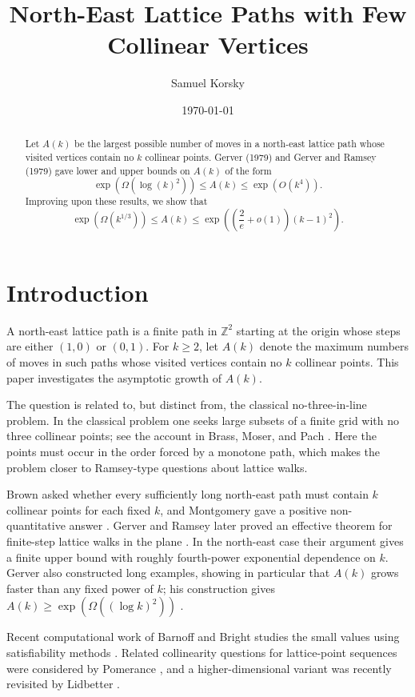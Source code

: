 \documentclass[11pt]{article}
\title{North-East Lattice Paths with Few Collinear Vertices}
\author{Samuel Korsky}
\date{\today}
\theoremstyle{definition}
\theoremstyle{remark}
\newcommand{\Z}{\mathbb Z}
\newcommand{\1}{\mathbf 1}
\begin{document}
\maketitle


\begin{abstract}
\noindent
Let $A(k)$ be the largest possible number of moves in a north-east lattice path whose visited vertices contain no $k$ collinear points.  Gerver (1979) and Gerver and Ramsey (1979) gave lower and upper bounds on $A(k)$ of the form
\[
\exp\left(\Omega(\log(k)^2)\right)\le A(k)\le
\exp\left(O(k^4)\right).
\]
Improving upon these results, we show that
\[
\exp\left(\Omega(k^{1/3})\right)\le A(k)\le
\exp\left(\left(\frac{2}{e}+o(1)\right)(k-1)^2\right).
\]
\end{abstract}

\section{Introduction}

A north-east lattice path is a finite path in $\Z^2$ starting at the origin whose steps are either $(1,0)$ or $(0,1)$. For $k\ge2$, let $A(k)$ denote the maximum numbers of moves in such paths whose visited vertices contain no $k$ collinear points. This paper investigates the asymptotic growth of $A(k)$.

\bigskip
\noindent
The question is related to, but distinct from, the classical no-three-in-line problem. In the classical problem one seeks large subsets of a finite grid with no three collinear points; see the account in Brass, Moser, and Pach \cite{BMP}. Here the points must occur in the order forced by a monotone path, which makes the problem closer to Ramsey-type questions about lattice walks.

\bigskip
\noindent
Brown asked whether every sufficiently long north-east path must contain $k$ collinear points for each fixed $k$, and Montgomery gave a positive non-quantitative answer \cite{Montgomery}. Gerver and Ramsey later proved an effective theorem for finite-step lattice walks in the plane \cite{GerverRamsey}. In the north-east case their argument gives a finite upper bound with roughly fourth-power exponential dependence on $k$. Gerver also constructed long examples, showing in particular that $A(k)$ grows faster than any fixed power of $k$; his construction gives $A(k)\ge \exp(\Omega((\log k)^2))$ \cite{Gerver}.

\bigskip
\noindent
Recent computational work of Barnoff and Bright studies the small values using satisfiability methods \cite{BarnoffBright}. Related collinearity questions for lattice-point sequences were considered by Pomerance \cite{Pomerance}, and a higher-dimensional variant was recently revisited by Lidbetter \cite{Lidbetter}.
\end{document}

